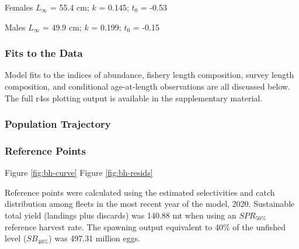 \documentclass[11pt,
  english,
  a4paper,
]{article}
\begin{document}
\begin{centering}

Females $L_{\infty}$ = 55.4 cm; $k$ = 0.145; $t_0$ = -0.53

Males $L_{\infty}$ = 49.9 cm; $k$ = 0.199; $t_0$ = -0.15

\end{centering}

\vspace{0.5cm}


\hypertarget{fits-to-the-data}{%
\subsubsection{Fits to the Data}\label{fits-to-the-data}}

\leavevmode\tagmcend\tagstructend

Model fits to the indices of abundance, fishery length composition, survey length composition, and conditional age-at-length observations are all discussed below. The full r4ss plotting output is available in the supplementary material.


\hypertarget{population-trajectory}{%
\subsubsection{Population Trajectory}\label{population-trajectory}}

\leavevmode\tagmcend\tagstructend


\hypertarget{reference-points-1}{%
\subsubsection{Reference Points}\label{reference-points-1}}

\leavevmode\tagmcend\tagstructend

Figure \ref{fig:bh-curve} Figure \ref{fig:bh-resids}

Reference points were calculated using the estimated selectivities and catch distribution among fleets in the most recent year of the model, 2020. Sustainable total yield (landings plus discards) was 140.88 mt when using an {\(SPR_{50\%}\)\leavevmode\tagmcend\tagstructend} reference harvest rate. The spawning output equivalent to 40\% of the unfished level ({\(SB_{40\%}\)\leavevmode\tagmcend\tagstructend}) was 497.31 million eggs.
\end{document}
